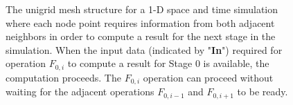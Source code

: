 \documentclass[prd,aps,showpacs,nofootinbib,floats,floatfix,twocolumn,letterpaper]{revtex4}
\begin{document}
\begin{figure}
\caption{The unigrid mesh structure  
for a 1-D space and time simulation where each node point requires information
from both adjacent neighbors in order to compute a result for the next stage in the simulation.
When the input data (indicated by "{\bf In}") required for operation $F_{0,i}$ to compute a result 
for Stage 0 is available, the computation proceeds.  The $F_{0,i}$ operation can proceed without
waiting for the adjacent operations $F_{0,i-1}$ and $F_{0,i+1}$ to be ready.}
\label{fig:unigrid}
\end{figure}

%
%
\end{document}
